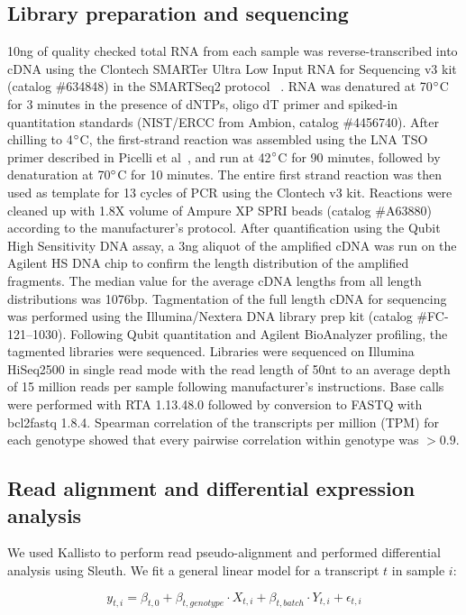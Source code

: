 \documentclass[10pt, onecolumn]{article}
\begin{document}
\subsection*{Library preparation and sequencing}
10ng of quality checked total RNA from each sample was
reverse-transcribed into cDNA using the Clontech SMARTer Ultra Low Input RNA for
Sequencing v3 kit (catalog \#634848) in the SMARTSeq2 protocol
~\cite{Picelli2014}.  RNA was denatured at 70$\degree{}$C for 3 minutes
in the presence of dNTPs, oligo dT primer and spiked-in quantitation standards
(NIST/ERCC from Ambion, catalog \#4456740).  After chilling to 4$\degree{}$C, the
first-strand reaction was assembled using the LNA TSO primer described in Picelli
et al~\cite{Picelli2014}, and run at 42$\degree{}$C for 90 minutes, followed by
denaturation at 70$\degree{}$C for 10 minutes.  The entire first strand reaction
was then used as template for 13 cycles of PCR using the Clontech v3 kit.
Reactions were cleaned up with 1.8X volume of Ampure XP SPRI beads (catalog
\#A63880) according to the manufacturer’s protocol.  After quantification using
the Qubit High Sensitivity DNA assay, a 3ng aliquot of the amplified cDNA was
run on the Agilent HS DNA chip to confirm the length distribution of the
amplified fragments.  The median value for the average cDNA lengths from all
length distributions was 1076bp.  Tagmentation of the full length cDNA for
sequencing was performed using the Illumina/Nextera DNA library prep kit (catalog
\#FC-121--1030).  Following Qubit quantitation and Agilent BioAnalyzer profiling,
the tagmented libraries were sequenced. Libraries were sequenced on Illumina
HiSeq2500 in single read mode with the read length of 50nt to an average depth
of 15 million reads per sample following manufacturer's instructions. Base calls
were performed with RTA 1.13.48.0 followed by conversion to FASTQ with bcl2fastq
1.8.4. Spearman correlation of the transcripts per million (TPM) for each
genotype showed that every pairwise correlation within genotype was $>0.9$.

\subsection*{Read alignment and differential expression analysis}
We used Kallisto to perform read pseudo-alignment and performed differential
analysis using Sleuth. We fit a general linear model for a transcript $t$ in
sample $i$:

\begin{equation}
  y_{t,i} = \beta_{t, 0} + \beta_{t, genotype}\cdot{}X_{t, i} +
  \beta_{t, batch}\cdot{}Y_{t, i} + \epsilon_{t, i}
\end{equation}
\end{document}
